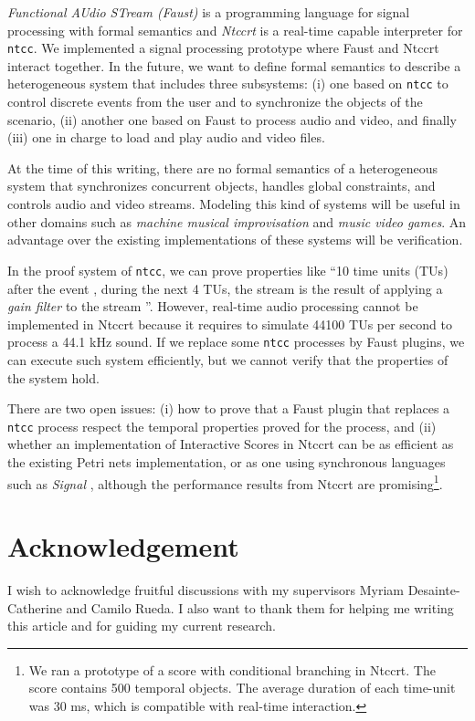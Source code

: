 \documentclass[]{lipics-iclp}
\theoremstyle{plain}\newtheorem{mainthm}[thm]{Main Theorem}
\theoremstyle{definition}\newtheorem{crucialdef}[thm]{Crucial Definition}
\begin{document}
\textit{Functional AUdio STream (Faust)} \cite{faust} is a programming language
for signal processing with formal semantics and \textit{Ntccrt} \cite{ntccrt} is a real-time capable interpreter for \texttt{ntcc}.
We implemented a signal processing prototype where Faust and Ntccrt interact together.
In the future, we want to define formal semantics to describe a heterogeneous system that includes three subsystems: (i) one based on \texttt{ntcc} to control
discrete events from the user and to synchronize the objects of the scenario, (ii)
another one based on Faust to process audio and video, and finally (iii) one in charge
to load and play audio and video files. 

At the time of this writing, there are no formal semantics of a heterogeneous system that synchronizes concurrent objects, handles global constraints, and controls audio and video streams. Modeling this kind of systems will be useful in other domains such as \textit{machine musical improvisation} \cite{Assayag-using} and \textit{music video games}. An advantage over the existing implementations of these systems will be verification.

In the proof system of \texttt{ntcc}, we can prove properties like  
``10 time units (TUs) after the event , during the next 4 TUs, the stream  is the result of applying a \textit{gain filter} to the stream ''. However, real-time audio processing cannot be implemented in Ntccrt because it requires to simulate 44100 TUs per second to process a 44.1 kHz sound. If we replace some \texttt{ntcc} processes by Faust plugins, we can execute such system efficiently, but we cannot verify that the properties of the system hold. 

There are two open issues: (i) how to 
prove that a Faust plugin that replaces a \texttt{ntcc} process respect the temporal properties proved for the process, and (ii) whether an implementation of Interactive Scores in Ntccrt can be as efficient as the existing Petri nets implementation, or as one using synchronous languages such as \textit{Signal} \cite{signal}, although the performance results from Ntccrt are promising\footnote{We ran a prototype of a score with conditional branching in Ntccrt. The score contains 500 temporal objects. The average duration of each time-unit was 30 ms, which is compatible with real-time interaction.}.

\section*{Acknowledgement}
I wish to acknowledge fruitful discussions with my supervisors Myriam Desainte-Catherine and Camilo Rueda.
I also want to thank them for helping me writing this article and for guiding my current research.
\end{document}
